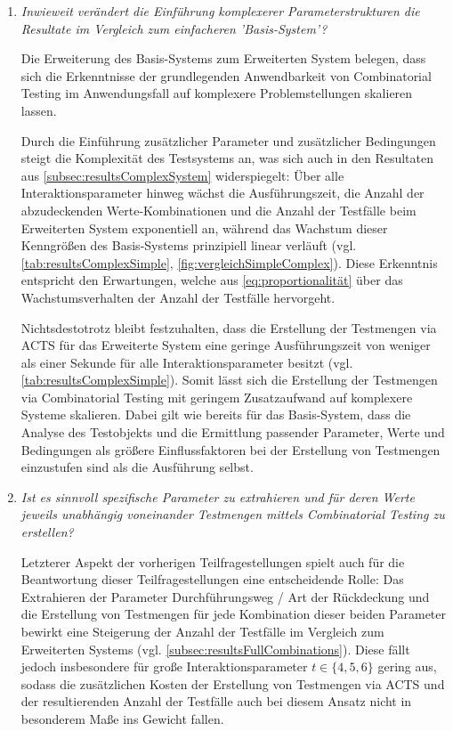 \begin{enumerate}
\item \textit{Inwieweit verändert die Einführung komplexerer Parameterstrukturen die Resultate im Vergleich zum einfacheren 'Basis-System'?}

Die Erweiterung des Basis-Systems zum Erweiterten System belegen, dass sich die Erkenntnisse der grundlegenden Anwendbarkeit von Combinatorial Testing im Anwendungsfall auf komplexere Problemstellungen skalieren lassen. 

Durch die Einführung zusätzlicher Parameter und zusätzlicher Bedingungen steigt die Komplexität des Testsystems an, was sich auch in den Resultaten aus \autoref{subsec:resultsComplexSystem} widerspiegelt: Über alle Interaktionsparameter hinweg wächst die Ausführungszeit, die Anzahl der abzudeckenden Werte-Kombinationen und die Anzahl der Testfälle beim Erweiterten System exponentiell an, während das Wachstum dieser Kenngrößen des Basis-Systems prinzipiell linear verläuft (vgl. \autoref{tab:resultsComplexSimple}, \autoref{fig:vergleichSimpleComplex}). Diese Erkenntnis entspricht den Erwartungen, welche aus \autoref{eq:proportionalität} über das Wachstumsverhalten der Anzahl der Testfälle hervorgeht.

Nichtsdestotrotz bleibt festzuhalten, dass die Erstellung der Testmengen via ACTS für das Erweiterte System eine geringe Ausführungszeit von weniger als einer Sekunde für alle Interaktionsparameter besitzt (vgl. \autoref{tab:resultsComplexSimple}). Somit lässt sich die Erstellung der Testmengen via Combinatorial Testing mit geringem Zusatzaufwand auf komplexere Systeme skalieren. Dabei gilt wie bereits für das Basis-System, dass die Analyse des Testobjekts und die Ermittlung passender Parameter, Werte und Bedingungen als größere Einflussfaktoren bei der Erstellung von Testmengen einzustufen sind als die Ausführung selbst.

\item \textit{Ist es sinnvoll spezifische Parameter zu extrahieren und für deren Werte jeweils unabhängig voneinander Testmengen mittels Combinatorial Testing zu erstellen?}

Letzterer Aspekt der vorherigen Teilfragestellungen spielt auch für die Beantwortung dieser Teilfragestellungen eine entscheidende Rolle: Das Extrahieren der Parameter Durchführungsweg / Art der Rückdeckung und die Erstellung von Testmengen für jede Kombination dieser beiden Parameter bewirkt eine Steigerung der Anzahl der Testfälle im Vergleich zum Erweiterten Systems (vgl. \autoref{subsec:resultsFullCombinations}). Diese fällt jedoch insbesondere für große Interaktionsparameter $t \in \{4,5,6\}$ gering aus, sodass die zusätzlichen Kosten der Erstellung von Testmengen via ACTS und der resultierenden Anzahl der Testfälle auch bei diesem Ansatz nicht in besonderem Maße ins Gewicht fallen.


\end{enumerate}
